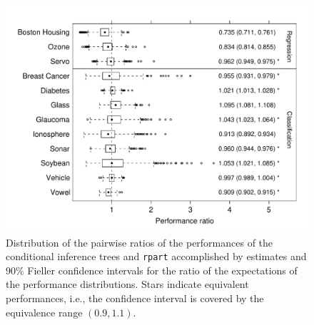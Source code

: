 \begin{figure}[t]
\begin{center}
\includegraphics[width = \textwidth]{ratiobox}
\caption{Distribution of the pairwise ratios of the performances of the
         conditional inference trees and
         \texttt{rpart} accomplished by estimates and $90\%$ Fieller confidence intervals for
         the ratio of the expectations of the performance distributions. 
         Stars indicate equivalent performances, i.e., the confidence interval 
         is covered by the equivalence range $(0.9, 1.1)$.\label{ratiofig}}
\end{center}
\end{figure}

